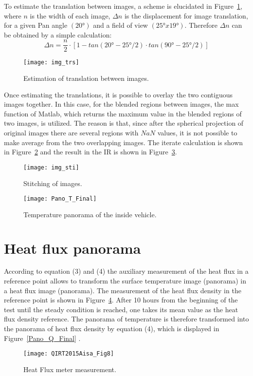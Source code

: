 \documentclass{tQRT2e}
\begin{document}
To estimate the translation between images, a scheme is elucidated in Figure~\ref{Trans}, where $ n $ is the width of each image, $ \Delta n $ is the displacement for image translation, for a given Pan angle $ (20°) $ and a field of view $ (25°x19°) $. Therefore $ \Delta n $ can be obtained by a simple calculation:
\begin{equation}
\Delta n=\dfrac{n}{2}⋅[1-tan(20°-25°/2)\cdot tan(90°-25°/2)]
\end{equation}

\begin{figure}[ht]
	\centering
	\texttt{[image: img\_trs]}
	\caption{ Estimation of translation between images.}
	\label{Trans}
\end{figure}

Once estimating the translations, it is possible to overlay the two contiguous images together. In this case, for the blended regions between images, the max function of Matlab, which returns the maximum value in the blended regions of two images, is utilized. The reason is that, since after the spherical projection of original images there are several regions with $ NaN $ values, it is not possible to make average from the two overlapping images. The iterate calculation is shown in Figure~\ref{img_sti} and the result in the IR is shown in Figure~\ref{Pano_T_Final}.
\begin{figure}[ht]
	\centering
	\texttt{[image: img\_sti]}
	\caption{Stitching of images.}
	\label{img_sti}
\end{figure}

\begin{figure}[ht]
	\hspace*{-20pt}
	\texttt{[image: Pano\_T\_Final]}
	\caption{Temperature panorama of the inside vehicle.}
	\label{Pano_T_Final}
\end{figure}

\section{Heat flux panorama}
According to equation (3) and (4) the auxiliary measurement of the heat flux in a reference point allows to transform the surface temperature image (panorama) in a heat flux image (panorama). The measurement of the heat flux density in the reference point is shown in Figure~\ref{Flux_meter}. After 10 hours from the beginning of the test until the steady condition is reached, one takes its mean value as the heat flux density reference. The panorama of temperature is therefore transformed into the panorama of heat flux density by equation (4), which is displayed in Figure~\ref{Pano_Q_Final} . 
\begin{figure}[ht]
	\centering
	\texttt{[image: QIRT2015Aisa\_Fig8]}
	\caption{Heat Flux meter measurement.}
	\label{Flux_meter}
\end{figure}
\end{document}
